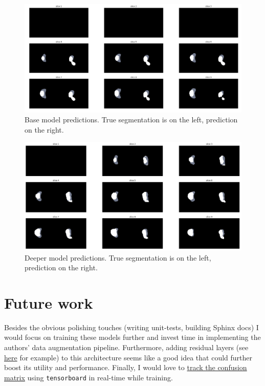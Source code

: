 \documentclass{article}
\begin{document}
\begin{figure}[t]
	\centering
	\includegraphics[width=\textwidth]{base_model2.png}
	\caption{Base model predictions. True segmentation is on the left, prediction on the right.}
	\label{fig:fig1}
\end{figure}

\begin{figure}[ht]
	\centering
	\includegraphics[width=\textwidth]{deeper_model2.png}
	\caption{Deeper model predictions. True segmentation is on the left, prediction on the right.}
	\label{fig:fig2}
\end{figure}

\section{Future work}

Besides the obvious polishing touches (writing unit-tests, building Sphinx docs) I would focus on training these models further and invest time in implementing the authors' data augmentation pipeline. Furthermore, adding residual layers (see \href{https://github.com/zhengyang-wang/3D-Unet--Tensorflow}{here} for example) to this architecture seems like a good idea that could further boost its utility and performance. Finally, I would love to \href{https://github.com/tensorflow/tensorboard/issues/227}{track the confusion matrix} using \texttt{tensorboard} in real-time while training.



\printbibliography
\end{document}

